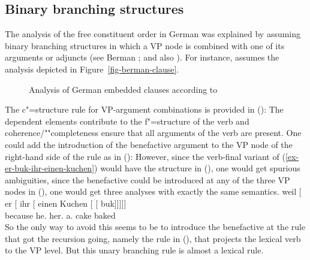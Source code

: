 \subsection{Binary branching structures}

The analysis of the free constituent order in German was explained by assuming binary branching
structures in which a VP node is combined with one of its arguments or adjuncts (see Berman
\citeyear[Section~2.1.3.1]{Berman96a-u}; \citeyear{Berman2003a} and also
).
For instance, \citet[]{Berman2003a} assumes the analysis depicted in
Figure~\vref{fig-berman-clause}.
\begin{figure}
\caption{Analysis of German embedded clauses according to \citet[]{Berman2003a}}\label{fig-berman-clause}
\end{figure}  
The c"=structure rule for VP-argument combinations is provided in ():
\ea
\label{lfg-vp-regel-two}
\z
The dependent elements contribute to the f"=structure of the verb and coherence/""completeness ensure that all
arguments of the verb are present. One could add the introduction of the benefactive argument to
the VP node of the right-hand side of the rule as in ():
\ea
\label{lfg-vp-regel-three}
\z
However, since the verb-final variant of
(\ref{ex-er-buk-ihr-einen-kuchen}) would have the structure in (), one would get spurious
ambiguities, since the benefactive could be introduced at any of the three VP nodes in (),
one would get three analyses with exactly the same semantics.
\ea
\label{ex-er-ihr-einen-kuchen-buk}
\gll weil    [ er [ ihr [ einen Kuchen [ [ buk]]]]]\\
     because {}        he.\nom{} {}        her.\dat{} {}        a.\acc{} cake       {}        {}       baked\\
\z
So the only way to avoid this seems to be to introduce the benefactive at the rule that got the recursion
going, namely the rule in (), that projects the lexical verb to the VP level.
\ea
\label{LFG-v-vp-two}
\z
But this unary branching rule is almost a lexical rule. 

